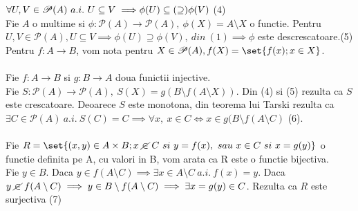 \documentclass{article}
\begin{document}
        $\forall U,V\in \mathscr{P}(A)\ a.i.\ U\subseteq V \implies \\  \phi(U) \subseteq (\supseteq) \phi(V)$ \hfill (4)\\
        Fie $A$ o multime si $\phi:\mathscr{P}(A)\rightarrow \mathscr{P}(A),\ \phi(X) = A\setminus X$ o functie. Pentru $U,V \in \mathscr{P}(A), U \subseteq V
        \implies \phi(U) \supseteq \phi(V),\ din\ (1) \implies \phi$ este
        descrescatoare.(5)\\ 
        Pentru $f:A\rightarrow B$, vom nota pentru $X\in \mathscr{P}(A), f(X) = \set{f(x);x\in X}$.\\ \\
        Fie $f:A\rightarrow B$ si $g:B\rightarrow A$ doua funictii injective.\\ Fie $S:\mathscr{P}(A) \rightarrow \mathscr{P}(A),\ S(X) = g(B\setminus f(A\setminus
        X))$. Din (4) si (5) rezulta ca $S$ este crescatoare. Deoarece $S$ este monotona, din teorema lui Tarski rezulta ca $\exists C\in \mathscr{P}(A)\ a.i.\
        S(C)=C \implies \forall x,\ x \in C \iff x \in g(B\setminus f(A\setminus C)$ \hfill (6).\\ \\
        Fie $R = \set{(x,y)\in A\times B; x\ \cancel{\in}\ C\ si\ y=f(x),\ sau\ x\in C\ si\ x=g(y)}$ o functie definita pe A, cu valori in B, vom arata ca R este o functie bijectiva.\\
        Fie $y \in B$. Daca $y \in f(A\setminus C) \implies \exists x \in A\setminus C\ a.i.\ f(x) = y$. Daca $y\ \cancel{\in}\ f(A\setminus C) \implies y\in
        B\setminus f(A\setminus C) \implies \exists x =g(y) \in C$. Rezulta ca $R$ este surjectiva \hfill (7)\\
\end{document}
